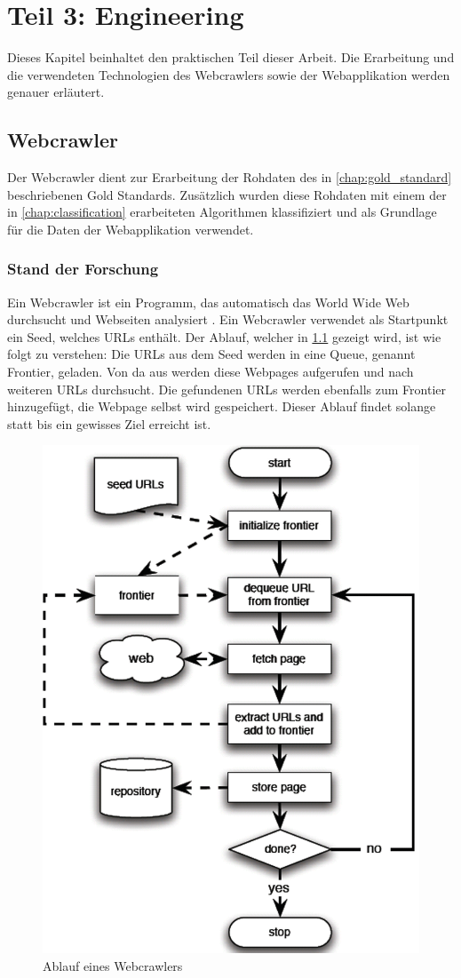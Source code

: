 \chapter{Teil 3: Engineering}
\label{chap:engineering}
Dieses Kapitel beinhaltet den praktischen Teil dieser Arbeit.
Die Erarbeitung und die verwendeten Technologien des Webcrawlers sowie der Webapplikation werden genauer erläutert.
\section{Webcrawler}
Der Webcrawler dient zur Erarbeitung der Rohdaten des in \cref{chap:gold_standard} beschriebenen Gold Standards.
Zusätzlich wurden diese Rohdaten mit einem der in \cref{chap:classification} erarbeiteten Algorithmen klassifiziert und als Grundlage für die Daten der Webapplikation verwendet.
\subsection{Stand der Forschung}
Ein Webcrawler ist ein Programm, das automatisch das World Wide Web durchsucht und Webseiten analysiert \cite[p. 311]{liu2007web}.
Ein Webcrawler verwendet als Startpunkt ein Seed, welches URLs enthält.
Der Ablauf, welcher in \cref{fig:flowchart_webcrawler} gezeigt wird, ist wie folgt zu verstehen:
Die URLs aus dem Seed werden in eine Queue, genannt Frontier, geladen.
Von da aus werden diese Webpages aufgerufen und nach weiteren URLs durchsucht.
Die gefundenen URLs werden ebenfalls zum Frontier hinzugefügt, die Webpage selbst wird gespeichert.
Dieser Ablauf findet solange statt bis ein gewisses Ziel erreicht ist. \cite[p. 313]{liu2007web}
\begin{figure}
	\centering
	\includegraphics[width=0.8\columnwidth,keepaspectratio]{img/flowchart_webcrawler.png}
	\caption{Ablauf eines Webcrawlers}
	\label{fig:flowchart_webcrawler}
\end{figure}
